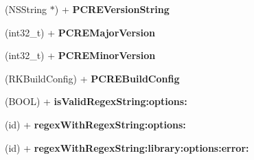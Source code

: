 \begin{DoxyCompactItemize}
\item 
\hypertarget{interface_r_k_regex_a5c0527782846c2e8b203b6a696253dec}{(N\-S\-String $\ast$) + {\bfseries P\-C\-R\-E\-Version\-String}}\label{interface_r_k_regex_a5c0527782846c2e8b203b6a696253dec}

\item 
\hypertarget{interface_r_k_regex_abd8b65cafa5f7307ab695a55c768d57f}{(int32\-\_\-t) + {\bfseries P\-C\-R\-E\-Major\-Version}}\label{interface_r_k_regex_abd8b65cafa5f7307ab695a55c768d57f}

\item 
\hypertarget{interface_r_k_regex_afd9f97672fb4f9ea18320ff196b2fc5f}{(int32\-\_\-t) + {\bfseries P\-C\-R\-E\-Minor\-Version}}\label{interface_r_k_regex_afd9f97672fb4f9ea18320ff196b2fc5f}

\item 
\hypertarget{interface_r_k_regex_a13027f32da44ae7ac6f1e436c3aefba3}{(R\-K\-Build\-Config) + {\bfseries P\-C\-R\-E\-Build\-Config}}\label{interface_r_k_regex_a13027f32da44ae7ac6f1e436c3aefba3}

\item 
\hypertarget{interface_r_k_regex_a7a32c67fbe4f41a4ef7607f637d53254}{(B\-O\-O\-L) + {\bfseries is\-Valid\-Regex\-String\-:options\-:}}\label{interface_r_k_regex_a7a32c67fbe4f41a4ef7607f637d53254}

\item 
\hypertarget{interface_r_k_regex_ae2518fd9c82197099249faf23f772d9a}{(id) + {\bfseries regex\-With\-Regex\-String\-:options\-:}}\label{interface_r_k_regex_ae2518fd9c82197099249faf23f772d9a}

\item 
\hypertarget{interface_r_k_regex_aaaa85c739d69fbe02031fdf93a7986b8}{(id) + {\bfseries regex\-With\-Regex\-String\-:library\-:options\-:error\-:}}\label{interface_r_k_regex_aaaa85c739d69fbe02031fdf93a7986b8}

\end{DoxyCompactItemize}
